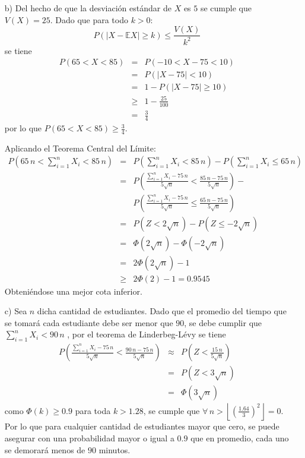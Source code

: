 \documentclass[a4paper,11pt]{article}
\begin{document}
\begin{itemize}
\begin{itemize}
\item[b)] Del hecho de que la desviaci\'on est\'andar de $X$ es $5$ se cumple que $V(X)=25$. Dado que para todo $k>0$:
$$
P(|X-\mathbb{E}X|\geq k)\leq \frac{V(X)}{k^2}
$$
se tiene
\begin{eqnarray}
P(65< X< 85)&=& P(-10<X-75<10)\nonumber\\
&=&P(|X-75|<10)\nonumber\\
&=&1-P(|X-75|\geq 10)\nonumber\\
&\geq&1-\frac{25}{100}\nonumber\\
&=&\frac{3}{4}\nonumber
\end{eqnarray}
por lo que $P(65<X<85)\geq \frac{3}{4}$.
\par Aplicando el Teorema Central del L\'imite:
\begin{eqnarray}
P\left(65\,n< \sum_{i=1}^nX_i< 85\,n\right)&=& P(\sum_{i=1}^nX_i<85\,n)-P(\sum_{i=1}^nX_i\leq 65\,n)\nonumber\\
&=&P\left(\frac{\displaystyle\sum_{i=1}^nX_i-75\,n}{5\sqrt{n}}<\frac{85\,n-75\,n}{5\sqrt{n}}\right)-\nonumber\\
&&P\left(\frac{\displaystyle\sum_{i=1}^nX_i-75\,n}{5\sqrt{n}}\leq\frac{65\,n-75\,n}{5\sqrt{n}}\right)\nonumber\\
&=&P\left(Z<2\sqrt{n}\right)-P\left(Z\leq -2\sqrt{n}\right)\nonumber\\
&=&\Phi\left(2\sqrt{n}\right)-\Phi\left(-2\sqrt{n}\right)\nonumber\\
&=&2\Phi\left(2\sqrt{n}\right)-1\nonumber\\
&\geq&2\Phi\left(2\right)-1=0.9545\nonumber
\end{eqnarray}
Obteni\'endose una mejor cota inferior.

\item[c)] Sea $n$ dicha cantidad de estudiantes. Dado que el promedio del tiempo que se tomar\'a cada estudiante debe ser menor que $90$, se debe cumplir que $\displaystyle\sum_{i=1}^n{X_i}<90\,n$ , por el teorema de Linderbeg-L\'evy se tiene
\begin{eqnarray}
P\left(\frac{\displaystyle\sum_{i=1}^n{X_i}-75\,n}{5\sqrt{n}}< \frac{90\,n-75\,n}{5\sqrt{n}}\right)&\approx&P\left(Z<\frac{15\,n}{5\sqrt{n}}\right)\nonumber\\
&=&P(Z<3\sqrt{n})\nonumber\\
&=&\Phi(3\sqrt{n})\nonumber
\end{eqnarray}
como $\Phi(k)\geq 0.9$ para toda $k>1.28$, se cumple que $\forall\,n>\left\lfloor\left(\frac{1.64}{3}\right)^2\right\rfloor=0$. Por lo que para cualquier cantidad de estudiantes mayor que cero, se puede asegurar con una probabilidad mayor o igual a $0.9$ que en promedio, cada uno se demorar\'a menos de $90$ minutos.

\end{itemize}


\end{itemize}
\end{document}

